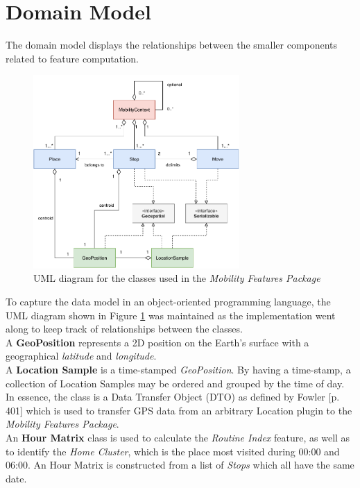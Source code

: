 \clearpage
\section{Domain Model}
The domain model displays the relationships between the smaller components related to feature computation.

\begin{figure}[h]
    \centering
    \includegraphics[width=0.7\textwidth]{images/diagrams/data-model-diagram.pdf}
    \caption{UML diagram for the classes used in the \textit{Mobility Features Package}}
    \label{fig:uml-diagram}
\end{figure}

To capture the data model in an object-oriented programming language, the UML diagram shown in Figure \ref{fig:uml-diagram} was maintained as the implementation went along to keep track of relationships between the classes.\\

A \textbf{GeoPosition} represents a 2D position on the Earth's surface with a geographical \textit{latitude} and \textit{longitude}.\\

A \textbf{Location Sample} is a time-stamped \textit{GeoPosition}. By having a time-stamp, a collection of Location Samples may be ordered and grouped by the time of day. In essence, the class is a Data Transfer Object (DTO) as defined by Fowler \cite{fowler-PEEA} [p. 401] which is used to transfer GPS data from an arbitrary Location plugin to the \textit{Mobility Features Package}.\\

An \textbf{Hour Matrix} class is used to calculate the \textit{Routine Index} feature, as well as to identify the \textit{Home Cluster}, which is the place most visited during 00:00 and 06:00. An Hour Matrix is constructed from a list of \textit{Stops} which all have the same date.\\

